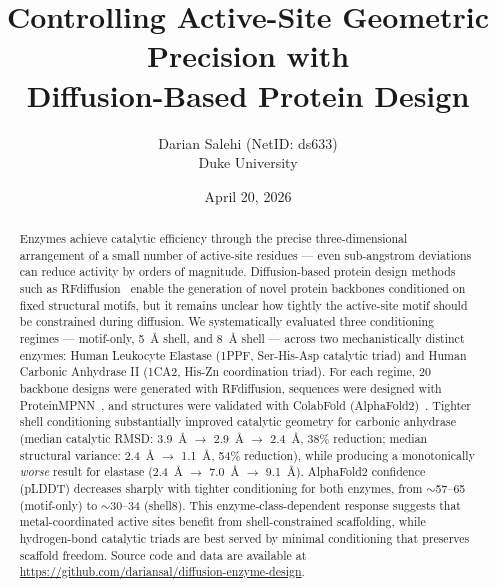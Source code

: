 \documentclass[11pt,letterpaper]{article}
\title{\textbf{Controlling Active-Site Geometric Precision with\\Diffusion-Based Protein Design}}
\author{Darian Salehi (NetID: ds633)\\Duke University}
\date{April 20, 2026}
\begin{document}
\maketitle

\begin{abstract}
Enzymes achieve catalytic efficiency through the precise three-dimensional arrangement of a small number of active-site residues — even sub-angstrom deviations can reduce activity by orders of magnitude. Diffusion-based protein design methods such as RFdiffusion~\cite{watson2023} enable the generation of novel protein backbones conditioned on fixed structural motifs, but it remains unclear how tightly the active-site motif should be constrained during diffusion. We systematically evaluated three conditioning regimes — motif-only, 5~\AA{} shell, and 8~\AA{} shell — across two mechanistically distinct enzymes: Human Leukocyte Elastase (1PPF, Ser-His-Asp catalytic triad) and Human Carbonic Anhydrase II (1CA2, His-Zn coordination triad). For each regime, 20 backbone designs were generated with RFdiffusion, sequences were designed with ProteinMPNN~\cite{dauparas2022}, and structures were validated with ColabFold (AlphaFold2)~\cite{mirdita2022,jumper2021}. Tighter shell conditioning substantially improved catalytic geometry for carbonic anhydrase (median catalytic RMSD: 3.9~\AA{} $\to$ 2.9~\AA{} $\to$ 2.4~\AA{}, 38\% reduction; median structural variance: 2.4~\AA{} $\to$ 1.1~\AA{}, 54\% reduction), while producing a monotonically \emph{worse} result for elastase (2.4~\AA{} $\to$ 7.0~\AA{} $\to$ 9.1~\AA{}). AlphaFold2 confidence (pLDDT) decreases sharply with tighter conditioning for both enzymes, from $\sim$57--65 (motif-only) to $\sim$30--34 (shell8). This enzyme-class-dependent response suggests that metal-coordinated active sites benefit from shell-constrained scaffolding, while hydrogen-bond catalytic triads are best served by minimal conditioning that preserves scaffold freedom. Source code and data are available at \url{https://github.com/dariansal/diffusion-enzyme-design}.
\end{abstract}

\end{document}
